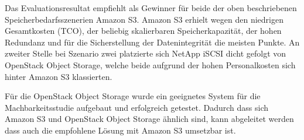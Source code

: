 Das Evaluationsresultat empfiehlt als Gewinner für beide der oben beschriebenen Speicherbedarfsszenerien Amazon S3. Amazon S3 erhielt wegen den niedrigen Gesamtkosten (TCO), der beliebig skalierbaren Speicherkapazität, der hohen Redundanz und für die Sicherstellung der Datenintegrität die meisten Punkte. An zweiter Stelle bei Szenario zwei platzierte sich NetApp iSCSI dicht gefolgt von OpenStack Object Storage, welche beide aufgrund der hohen Personalkosten sich hinter Amazon S3 klassierten.

Für die OpenStack Object Storage wurde ein geeignetes System für die Machbarkeitsstudie aufgebaut und erfolgreich getestet. Dadurch dass sich Amazon S3 und OpenStack Object Storage ähnlich sind, kann abgeleitet werden dass auch die empfohlene Lösung mit Amazon S3 umsetzbar ist. 


